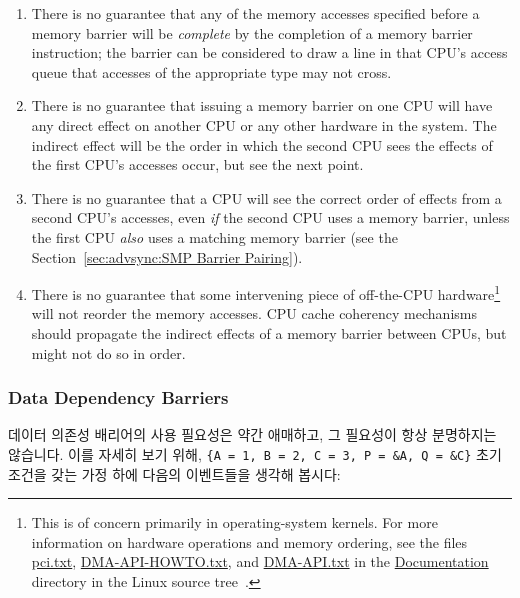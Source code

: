 \begin{enumerate}
\begin{enumerate}
\item	There is no guarantee that any of the memory accesses specified
	before a memory barrier will be \emph{complete} by the completion
	of a memory barrier instruction; the barrier can be considered
	to draw a line in that CPU's access queue that accesses of the
	appropriate type may not cross.
\item	There is no guarantee that issuing a memory barrier on one CPU
	will have any direct effect on another CPU or any other hardware
	in the system.	The indirect effect will be the order in which
	the second CPU sees the effects of the first CPU's accesses occur,
	but see the next point.
\item	There is no guarantee that a CPU will see the correct order
	of effects from a second CPU's accesses, even \emph{if} the second CPU
	uses a memory barrier, unless the first CPU \emph{also} uses a matching
	memory barrier (see the
	Section~\ref{sec:advsync:SMP Barrier Pairing}).
\item	There is no guarantee that some intervening piece of off-the-CPU
	hardware\footnote{
		This is of concern primarily in operating-system kernels.
		For more information on hardware operations and memory
		ordering, see the files \url{pci.txt}, \url{DMA-API-HOWTO.txt},
		and \url{DMA-API.txt} in the \url{Documentation} directory in
		the Linux source tree~\cite{Torvalds2.6kernel}.}
	will not reorder the memory accesses.  CPU cache
	coherency mechanisms should propagate the indirect effects of
	a memory barrier between CPUs, but might not do so in order.
\end{enumerate}
\fi

\subsubsection{Data Dependency Barriers}
\label{sec:advsync:Data Dependency Barriers}

데이터 의존성 배리어의 사용 필요성은 약간 애매하고, 그 필요성이 항상 분명하지는
않습니다.
이를 자세히 보기 위해, {\tt \{A = 1, B = 2, C = 3, P = \&A, Q = \&C\}} 초기
조건을 갖는 가정 하에 다음의 이벤트들을 생각해 봅시다:

\end{enumerate}
